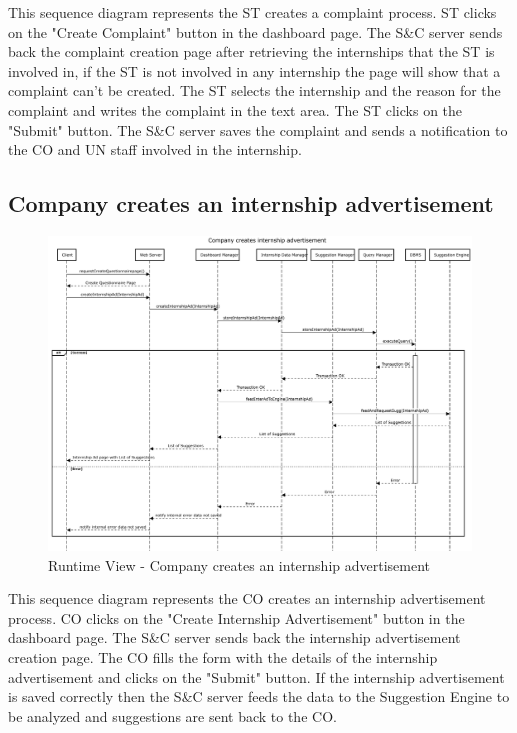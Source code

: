 \par This sequence diagram represents the ST creates a complaint process. ST clicks on the "Create Complaint" button in the
dashboard page. The S\&C server sends back the complaint creation page after retrieving the internships that the ST is involved in, 
if the ST is not involved in any internship the page will show that a complaint can't be created. The ST selects the internship 
and the reason for the complaint and writes the complaint in the text area. The ST clicks on the "Submit" button. The S\&C server
saves the complaint and sends a notification to the CO and UN staff involved in the internship.

\subsection{Company creates an internship advertisement}
\label{sub:company-creates-an-internship-advertisement}%

\begin{figure}[H]
      \centering
      \includegraphics[width=1.0\textwidth]{Images/RV_06.pdf}
      \caption{Runtime View - Company creates an internship advertisement}
      \label{fig:rv-company-creates-an-internship-advertisement}
\end{figure}

\par This sequence diagram represents the CO creates an internship advertisement process. CO clicks on the "Create Internship
Advertisement" button in the dashboard page. The S\&C server sends back the internship advertisement creation page. The CO fills
the form with the details of the internship advertisement and clicks on the "Submit" button. If the internship advertisement is
saved correctly then the S\&C server feeds the data to the Suggestion Engine to be analyzed and suggestions are sent back to the CO.

